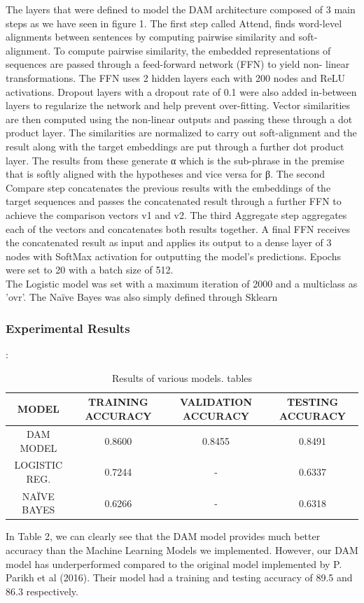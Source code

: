 \documentclass[runningheads]{llncs}
\begin{document}
\begin{itemize}
The layers that were defined to model the DAM architecture composed of 3 main steps as we have seen in figure 1. The first step called Attend, finds word-level alignments between sentences by computing pairwise similarity and soft-alignment. To compute pairwise similarity, the embedded representations of sequences are passed through a feed-forward network (FFN) to yield non- linear transformations. The FFN uses 2 hidden layers each with 200 nodes and ReLU activations. Dropout layers with a dropout rate of 0.1 were also added in-between layers to regularize the network and help prevent over-fitting. Vector similarities are then computed using the non-linear outputs and passing these through a dot product layer. The similarities are normalized to carry out soft-alignment and the result along with the target embeddings are put through a further dot product layer. The results from these generate α which is the sub-phrase in the premise that is softly aligned with the hypotheses and vice versa for β. The second Compare step concatenates the previous results with the embeddings of the target sequences and passes the concatenated result through a further FFN to achieve the comparison vectors v1 and v2. The third Aggregate step aggregates each of the vectors and concatenates both results together.  A final FFN receives the concatenated result as input and applies its output to a dense layer of 3 nodes with SoftMax activation for outputting the model’s predictions. Epochs were set to 20 with a batch size of 512.
\\
The Logistic model was set with a maximum iteration of 2000 and a multiclass as 'ovr'.  The Naïve Bayes was also simply defined through Sklearn

\end{itemize}
\subsubsection{Experimental Results} {:}
\\
\begin{table}
\begin{center}
	\caption{Results of various models.
	tables}\label{table:2}
	\begin{tabular}{||c c c c||} 
		\hline
		MODEL & TRAINING ACCURACY & VALIDATION ACCURACY &TESTING ACCURACY \\ [0.5ex] 
		\hline\hline
	DAM MODEL & 0.8600 &0.8455&    0.8491 \\ 
		\hline
	LOGISTIC REG. &0.7244 &   -      &        0.6337 \\
		\hline
	NAÏVE BAYES &   0.6266 &  -      &       0.6318 \\
		\hline
	\end{tabular}
\end{center}
\end{table}
In Table 2, we can clearly see that the DAM model provides much better accuracy than the Machine Learning Models we implemented.  However, our DAM model has underperformed compared to the original model implemented by P. Parikh et al (2016). Their model had a training and testing accuracy of 89.5 and 86.3 respectively.
\end{document}
